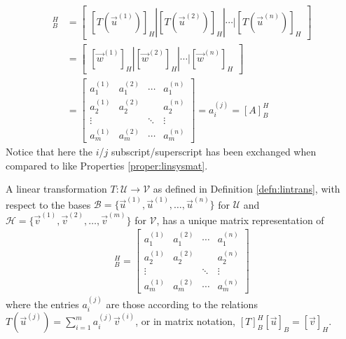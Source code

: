 \begin{align*}
[T]_B^H &= 
\begin{bmatrix}
[T(\vec{u}^{(1)})]_H | [T(\vec{u}^{(2)})]_H | \cdots | [T(\vec{u}^{(n)})]_H
\end{bmatrix} \\
&=
\begin{bmatrix}
[\vec{w}^{(1)}]_H | [\vec{w}^{(2)}]_H | \cdots | [\vec{w}^{(n)}]_H
\end{bmatrix} \\
&= 
\begin{bmatrix}
a_1^{(1)} & a_1^{(2)} & \cdots & a_1^{(n)} \\
a_2^{(1)} & a_2^{(2)} &  & a_2^{(n)} \\
\vdots & & \ddots & \vdots \\
a_m^{(1)} & a_m^{(2)} & \cdots & a_m^{(n)}
\end{bmatrix}
= a_i^{(j)} = [A]_B^H
\end{align*}
Notice that here the $i$/$j$ subscript/superscript has been exchanged when compared to like Properties \ref{proper:linsysmat}.
\begin{defn}
\label{defn:matrixrepoflintrans}
A linear transformation $T: \mathcal{U} \to \mathcal{V}$ as defined in Definition \ref{defn:lintrans}, with respect to the bases $\mathcal{B} = \{\vec{u}^{(1)}, \vec{u}^{(1)}, \ldots, \vec{u}^{(n)}\}$ for $\mathcal{U}$ and $\mathcal{H} = \{\vec{v}^{(1)}, \vec{v}^{(2)}, \ldots, \vec{v}^{(m)}\}$ for $\mathcal{V}$, has a unique matrix representation of
\begin{align*}
[T]_B^H = 
\begin{bmatrix}
a_1^{(1)} & a_1^{(2)} & \cdots & a_1^{(n)} \\
a_2^{(1)} & a_2^{(2)} &  & a_2^{(n)} \\
\vdots & & \ddots & \vdots \\
a_m^{(1)} & a_m^{(2)} & \cdots & a_m^{(n)}
\end{bmatrix}
\end{align*}
where the entries $a_i^{(j)}$ are those according to the relations $T(\vec{u}^{(j)}) = \sum_{i=1}^{m} a_i^{(j)}\vec{v}^{(i)}$, or in matrix notation, $[T]_B^H [\vec{u}]_B = [\vec{v}]_H$.
\end{defn}


